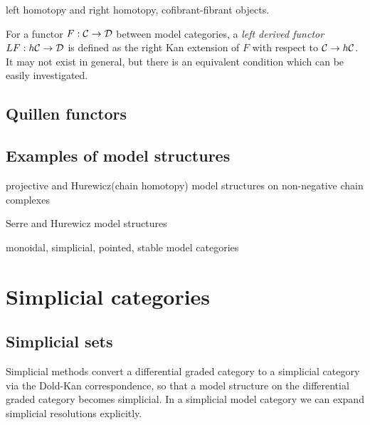 \documentclass{../../large}
\begin{document}
\begin{prb}
left homotopy and right homotopy, cofibrant-fibrant objects.
\end{prb}

\begin{prb}
For a functor $F:\mathcal{C}\to\mathcal{D}$ between model categories, a \emph{left derived functor} $LF:h\mathcal{C}\to\mathcal{D}$ is defined as the right Kan extension of $F$ with respect to $\mathcal{C}\to h\mathcal{C}$.
It may not exist in general, but there is an equivalent condition which can be easily investigated.
\end{prb}




\section{Quillen functors}



\section{Examples of model structures}

\begin{prb}
projective and Hurewicz(chain homotopy) model structures on non-negative chain complexes
\end{prb}

\begin{prb}
Serre and Hurewicz model structures
\end{prb}




monoidal, simplicial, pointed, stable model categories



\chapter{Simplicial categories}

\section{Simplicial sets}

Simplicial methods convert a differential graded category to a simplicial category via the Dold-Kan correspondence, so that a model structure on the differential graded category becomes simplicial.
In a simplicial model category we can expand simplicial resolutions explicitly.
\end{document}
